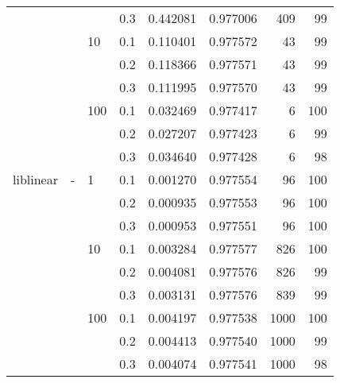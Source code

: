 \begin{table}[H]
\begin{tabular}{llllrrrr}
          &   &     & 0.3 &  0.442081 &  0.977006 &     409 &    99 \\
          &   & 10  & 0.1 &  0.110401 &  0.977572 &      43 &    99 \\
          &   &     & 0.2 &  0.118366 &  0.977571 &      43 &    99 \\
          &   &     & 0.3 &  0.111995 &  0.977570 &      43 &    99 \\
          &   & 100 & 0.1 &  0.032469 &  0.977417 &       6 &   100 \\
          &   &     & 0.2 &  0.027207 &  0.977423 &       6 &    99 \\
          &   &     & 0.3 &  0.034640 &  0.977428 &       6 &    98 \\
liblinear & - & 1   & 0.1 &  0.001270 &  0.977554 &      96 &   100 \\
          &   &     & 0.2 &  0.000935 &  0.977553 &      96 &   100 \\
          &   &     & 0.3 &  0.000953 &  0.977551 &      96 &   100 \\
          &   & 10  & 0.1 &  0.003284 &  0.977577 &     826 &   100 \\
          &   &     & 0.2 &  0.004081 &  0.977576 &     826 &    99 \\
          &   &     & 0.3 &  0.003131 &  0.977576 &     839 &    99 \\
          &   & 100 & 0.1 &  0.004197 &  0.977538 &    1000 &   100 \\
          &   &     & 0.2 &  0.004413 &  0.977540 &    1000 &    99 \\
          &   &     & 0.3 &  0.004074 &  0.977541 &    1000 &    98 \\
\bottomrule
\end{tabular}
\end{table}
